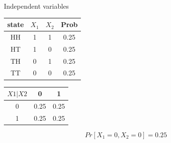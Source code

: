\documentclass{beamer}\usepackage[]{graphicx}\usepackage[]{color}
\begin{document}
\begin{frame}[fragile]{Independent variables \;\;}


\begin{tabular}{|c|c|c|c|}
\hline
state & $X_1$ & $X_2$ & Prob\\ \hline
HH & 1 & 1 & 0.25\\ \hline
HT & 1 & 0 & 0.25\\ \hline
TH & 0 & 1 & 0.25\\ \hline
TT & 0 & 0 & 0.25\\ \hline
\end{tabular} \pause \newline \newline

\begin{tabular}{|c|c|c|}
\hline
$X1|X2$ & 0 & 1 \\ \hline 
0 &  0.25 &  0.25 \\ \hline
1 &  0.25 &  0.25 \\ \hline
\end{tabular} \pause \newline \newline


$$ Pr[X_1=0, X_2=0] = 0.25 $$
\end{frame}
\end{document}
